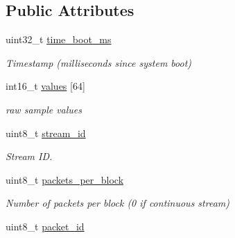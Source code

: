 \subsection*{Public Attributes}
\begin{DoxyCompactItemize}
\item 
\hypertarget{struct____mavlink__raw__data__stream__t_aa05fafaf0646c9c3dbc9e7d1209e7435}{uint32\+\_\+t \hyperlink{struct____mavlink__raw__data__stream__t_aa05fafaf0646c9c3dbc9e7d1209e7435}{time\+\_\+boot\+\_\+ms}}\label{struct____mavlink__raw__data__stream__t_aa05fafaf0646c9c3dbc9e7d1209e7435}

\begin{DoxyCompactList}\small\item\em Timestamp (milliseconds since system boot) \end{DoxyCompactList}\item 
\hypertarget{struct____mavlink__raw__data__stream__t_ad8b7375279258860f5af05d67e202de4}{int16\+\_\+t \hyperlink{struct____mavlink__raw__data__stream__t_ad8b7375279258860f5af05d67e202de4}{values} \mbox{[}64\mbox{]}}\label{struct____mavlink__raw__data__stream__t_ad8b7375279258860f5af05d67e202de4}

\begin{DoxyCompactList}\small\item\em raw sample values \end{DoxyCompactList}\item 
\hypertarget{struct____mavlink__raw__data__stream__t_a75be20ae3d9f50477aec633edd297aa5}{uint8\+\_\+t \hyperlink{struct____mavlink__raw__data__stream__t_a75be20ae3d9f50477aec633edd297aa5}{stream\+\_\+id}}\label{struct____mavlink__raw__data__stream__t_a75be20ae3d9f50477aec633edd297aa5}

\begin{DoxyCompactList}\small\item\em Stream I\+D. \end{DoxyCompactList}\item 
\hypertarget{struct____mavlink__raw__data__stream__t_a8d8ac1f21d4fe49ff9e502e299a1c4bc}{uint8\+\_\+t \hyperlink{struct____mavlink__raw__data__stream__t_a8d8ac1f21d4fe49ff9e502e299a1c4bc}{packets\+\_\+per\+\_\+block}}\label{struct____mavlink__raw__data__stream__t_a8d8ac1f21d4fe49ff9e502e299a1c4bc}

\begin{DoxyCompactList}\small\item\em Number of packets per block (0 if continuous stream) \end{DoxyCompactList}\item 
\hypertarget{struct____mavlink__raw__data__stream__t_adec48156bf0eb3fd9fa507ea57b172f0}{uint8\+\_\+t \hyperlink{struct____mavlink__raw__data__stream__t_adec48156bf0eb3fd9fa507ea57b172f0}{packet\+\_\+id}}\label{struct____mavlink__raw__data__stream__t_adec48156bf0eb3fd9fa507ea57b172f0}


\end{DoxyCompactItemize}
